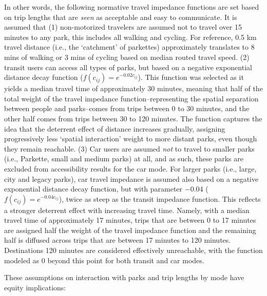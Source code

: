 \documentclass[
11pt, %
oneside, %
english, %
singlespacing, %
]{macthesis} %
\begin{document}
In other words, the following normative travel impedance functions are set based on trip lengths that are \emph{seen} as acceptable and easy to communicate. It is assumed that (1) non-motorized travelers are assumed not to travel over 15 minutes to any park, this includes all walking and cycling. For reference, 0.5 km travel distance (i.e., the `catchment' of parkettes) approximately translates to 8 mins of walking or 3 mins of cycling based on median routed travel speed. (2) transit users can access all types of parks, but based on a negative exponential distance decay function (\(f(c_{ij}) = e^{-0.02c_{ij}}\)). This function was selected as it yields a median travel time of approximately 30 minutes, meaning that half of the total weight of the travel impedance function--representing the spatial separation between people and parks--comes from trips between 0 to 30 minutes, and the other half comes from trips between 30 to 120 minutes. The function captures the idea that the deterrent effect of distance increases gradually, assigning progressively less `spatial interaction' weight to more distant parks, even though they remain reachable. (3) Car users are assumed \emph{not} to travel to smaller parks (i.e., Parkette, small and medium parks) at all, and as such, these parks are excluded from accessibility results for the car mode. For larger parks (i.e., large, city and legacy parks), car travel impedance is assumed also based on a negative exponential distance decay function, but with parameter \(-0.04\) (\(f(c_{ij}) = e^{-0.04c_{ij}}\)), twice as steep as the transit impedance function. This reflects a stronger deterrent effect with increasing travel time. Namely, with a median travel time of approximately 17 minutes, trips that are between 0 to 17 minutes are assigned half the weight of the travel impedance function and the remaining half is diffused across trips that are between 17 minutes to 120 minutes. Destinations 120 minutes are considered effectively unreachable, with the function modeled as 0 beyond this point for both transit and car modes.

These assumptions on interaction with parks and trip lengths by mode have equity implications:
\end{document}
